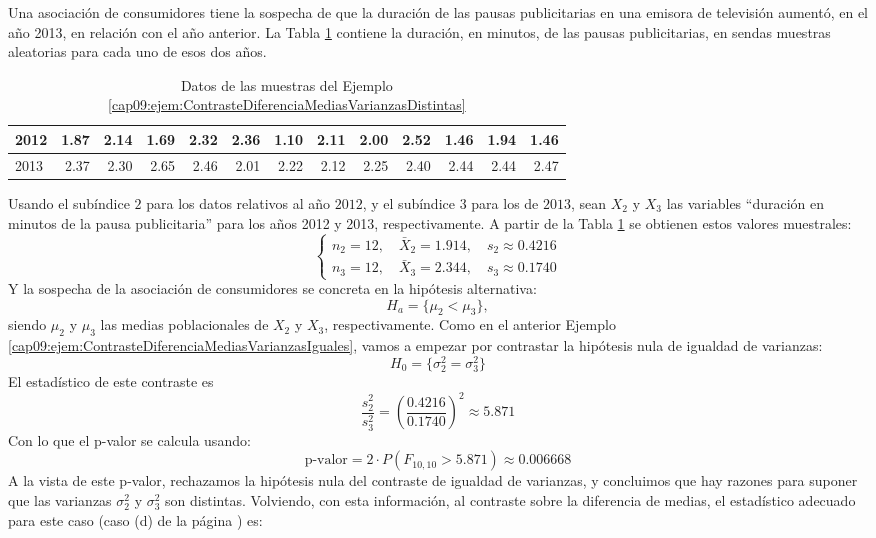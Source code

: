\begin{ejemplo}
\label{cap09:ejem:ContrasteDiferenciaMediasVarianzasDistintas}
Una asociación de consumidores tiene la sospecha de que la duración de las pausas publicitarias en una emisora de televisión aumentó, en el año 2013, en relación con el año anterior. La Tabla \ref{cap09:tabla:ejemploContrasteDiferneciaMediasVarianzasDistintas} contiene la duración, en minutos, de las pausas publicitarias, en sendas muestras aleatorias para cada uno de esos dos años.
\begin{table}[b]
\begin{center}
{\small
\begin{tabular}{|l|rrrrrrrrrrrr|}
  \hline
2012 & 1.87 & 2.14 & 1.69 & 2.32 & 2.36 & 1.10 & 2.11 & 2.00 & 2.52 & 1.46 & 1.94 & 1.46 \\
\hline
2013 & 2.37 & 2.30 & 2.65 & 2.46 & 2.01 & 2.22 & 2.12 & 2.25 & 2.40 & 2.44 & 2.44 & 2.47 \\
\hline
\end{tabular}
}
\end{center}
\caption{Datos de las muestras del Ejemplo \ref{cap09:ejem:ContrasteDiferenciaMediasVarianzasDistintas}}
\label{cap09:tabla:ejemploContrasteDiferneciaMediasVarianzasDistintas}
\end{table}
Usando el subíndice $2$ para los datos relativos al año $2012$, y el subíndice $3$ para los de $2013$, sean $X_2$ y $X_3$ las variables {``duración en minutos de la pausa publicitaria''} para los años 2012 y 2013, respectivamente. A partir de la Tabla \ref{cap09:tabla:ejemploContrasteDiferneciaMediasVarianzasDistintas} se obtienen estos valores muestrales:
\[
\begin{cases}
n_2=12,\quad \bar X_2=1.914,\quad s_2\approx 0.4216\\[3mm]
n_3=12,\quad \bar X_3=2.344,\quad s_3\approx 0.1740
\end{cases}
\]
Y la sospecha de la asociación de consumidores se concreta en la hipótesis alternativa:
\[H_a=\{\mu_2<\mu_3\},\]
siendo $\mu_2$ y $\mu_3$ las medias poblacionales de $X_2$ y $X_3$, respectivamente. Como en el anterior Ejemplo \ref{cap09:ejem:ContrasteDiferenciaMediasVarianzasIguales}, vamos a empezar por contrastar la hipótesis nula de igualdad de varianzas:
\[H_0=\{\sigma^2_2=\sigma^2_3\}\]
El estadístico de este contraste es
\[\dfrac{s_2^2}{s_3^2}=\left(\dfrac{0.4216}{0.1740}\right)^2\approx 5.871\]
Con lo que el p-valor se calcula usando:
\[\mbox{p-valor}=2\cdot P\left(F_{10,10}>5.871\right)\approx 0.006668\]
A la vista de este p-valor, rechazamos la hipótesis nula del contraste de igualdad de varianzas, y concluimos que hay razones para suponer que las varianzas $\sigma_2^2$ y $\sigma_3^2$ son distintas. Volviendo, con esta información, al contraste sobre la diferencia de medias, el estadístico adecuado para este caso (caso (d) de la página \pageref{cap09:lugar:ContrasteDiferenciaMediasVarianzasIguales}) es:

\end{ejemplo}
